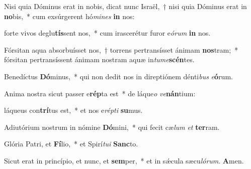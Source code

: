 \item Nisi quia Dóminus erat in nobis, dicat nunc Israël,~† nisi quia Dóminus erat in \textbf{no}bis,~* cum exsúrgerent hó\textit{mi}\textit{nes} \textbf{in} nos:

\item forte vivos deglu\textbf{tís}sent nos,~* cum irascerétur furor e\textit{ó}\textit{rum} \textbf{in} nos.

\item Fórsitan aqua absorbuísset nos,~† torrens pertransísset ánimam \textbf{nos}tram;~* fórsitan pertransíssent ánimam nostram aquæ in\textit{tu}\textit{me}\textbf{scén}tes.

\item Benedíctus \textbf{Dó}minus,~* qui non dedit nos in direptiónem dénti\textit{bus} \textit{e}\textbf{ó}rum.

\item Anima nostra sicut passer e\textbf{rép}ta est~* de láque\textit{o} \textit{ve}\textbf{nán}tium:

\item láqueus con\textbf{trí}tus est,~* et nos e\textit{rép}\textit{ti} \textbf{su}mus.

\item Adiutórium nostrum in nómine \textbf{Dó}mini,~* qui fecit cæ\textit{lum} \textit{et} \textbf{ter}ram.

\item Glória Patri, et \textbf{Fí}lio,~* et Spirí\textit{tu}\textit{i} \textbf{Sanc}to.

\item Sicut erat in princípio, et nunc, et \textbf{sem}per,~* et in sǽcula sæcu\textit{ló}\textit{rum}. \textbf{A}men.